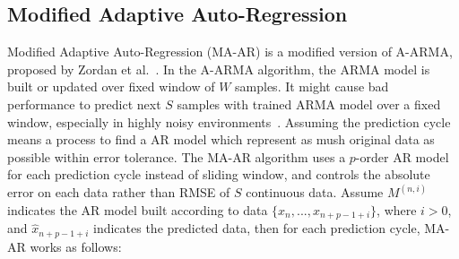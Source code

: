 
\subsection{Modified Adaptive Auto-Regression}

Modified Adaptive Auto-Regression (MA-AR) is a modified version of A-ARMA,
proposed by Zordan et al.~\cite{zordan2012compress}. In the A-ARMA algorithm,
the ARMA model is built or updated over fixed window of $W$ samples. It might
cause bad performance to predict next $S$ samples with trained ARMA model over a
fixed window, especially in highly noisy environments~\cite{zordan2012compress}.
Assuming the prediction cycle means a process to find a AR model which represent
as mush original data as possible within error tolerance. The MA-AR algorithm
uses a $p$-order AR model for each prediction cycle instead of sliding window,
and controls the absolute error on each data rather than RMSE of $S$ continuous
data. Assume $M^{(n, i)}$ indicates the AR model built according to data 
$\{x_n, ..., x_{n+p-1+i} \}$, where $i>0$, and $\hat{x}_{n+p-1+i}$ indicates the
predicted data, then for each prediction cycle, MA-AR works as follows:

